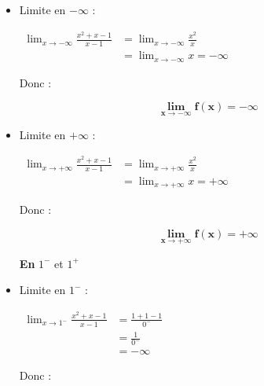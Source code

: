 \documentclass[12pt,a4paper]{article}
\begin{document}
\begin{enumerate}
\begin{itemize}
    \item Limite en \( -\infty \) :

\(
\begin{aligned}
    \lim_{x \to -\infty} \frac{x^2 + x - 1}{x - 1} &= \lim_{x \to -\infty} \frac{x^2}{x}\\
    &= \lim_{x \to -\infty} x = -\infty
\end{aligned}
\)

    Donc :
    
					\begin{resultbox}
            \[
                \mathbf{\lim_{x \to -\infty} f(x) = -\infty }
            \]
					\end{resultbox} 

    \item Limite en \( +\infty \) :

    \(
			\begin{aligned}
    	\lim_{x \to +\infty} \frac{x^2 + x - 1}{x - 1} &= \lim_{x \to +\infty} \frac{x^2}{x}\\
    	&= \lim_{x \to +\infty} x = +\infty
			\end{aligned}
		\)

		    Donc :
    
					\begin{resultbox}
            \[
                \mathbf{\lim_{x \to +\infty} f(x) = +\infty }
            \]
					\end{resultbox}

\textbf{En} $1^-$ et $1^+$

\begin{center}
\end{center}

    \item Limite en \( 1^- \) :

    \(
			\begin{aligned}
				\lim_{x \to 1^-} \frac{x^2 + x - 1}{x - 1} &= \frac{1 + 1 - 1}{0^-}\\ 
																									 &= \frac{1}{0^-}\\ 
																									 &= -\infty
			\end{aligned}
		\)

    Donc :
    

\end{itemize}
\end{enumerate}
\end{document}
